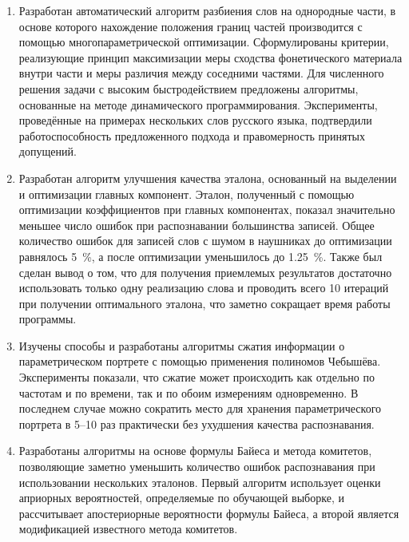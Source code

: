 
\begin{enumerate}[label={\arabic*)}]
	\item Разработан автоматический алгоритм разбиения слов на однородные части, в основе которого нахождение положения границ частей производится с помощью многопараметрической оптимизации.
	Сформулированы критерии, реализующие принцип максимизации меры сходства фонетического материала внутри части и меры различия между соседними частями. 
	Для численного решения задачи с высоким быстродействием предложены алгоритмы, основанные на методе динамического программирования.
	Эксперименты, проведённые на примерах нескольких слов русского языка, подтвердили работоспособность предложенного подхода и правомерность принятых допущений.
	\item Разработан алгоритм улучшения качества эталона, основанный на выделении и оптимизации главных компонент.
	Эталон, полученный с помощью оптимизации коэффициентов при главных компонентах, показал значительно меньшее число ошибок при распознавании большинства записей.
	Общее количество ошибок для записей слов с шумом в наушниках до оптимизации равнялось 5~\%, а после оптимизации уменьшилось до 1.25~\%.
	Также был сделан вывод о том, что для получения приемлемых результатов достаточно использовать только одну реализацию слова и проводить всего 10 итераций при получении оптимального эталона, что заметно сокращает время работы программы.
	\item Изучены способы и разработаны алгоритмы сжатия информации о параметрическом портрете с помощью применения полиномов Чебышёва.
	Эксперименты показали, что сжатие может происходить как отдельно по частотам и по времени, так и по обоим измерениям одновременно.
	В последнем случае можно сократить место для хранения параметрического портрета в 5--10 раз практически без ухудшения качества распознавания.	
	\item Разработаны алгоритмы на основе формулы Байеса и метода комитетов, позволяющие заметно уменьшить количество ошибок распознавания при использовании нескольких эталонов.
	Первый алгоритм использует оценки априорных вероятностей, определяемые по обучающей выборке, и рассчитывает апостериорные вероятности формулы Байеса, а второй является модификацией известного метода комитетов.

\end{enumerate}
